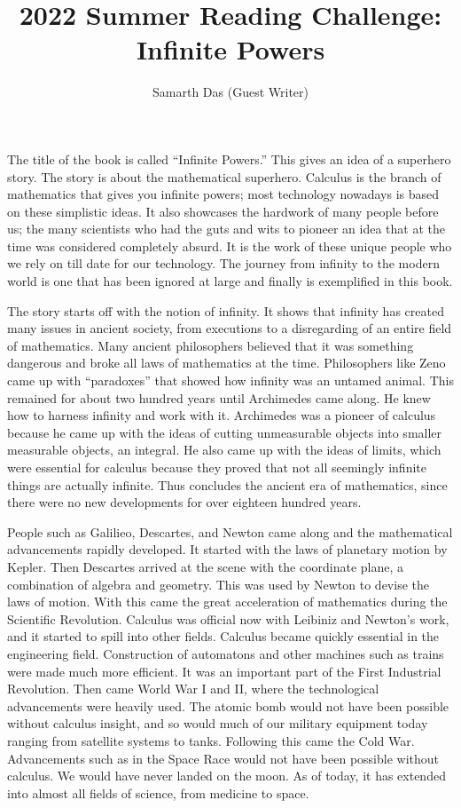 \title{2022 Summer Reading Challenge: Infinite Powers}
\author{Samarth Das (Guest Writer)}


The title of the book is called “Infinite Powers.” This gives an idea of a superhero story. The
story is about the mathematical superhero. Calculus is the branch of mathematics that gives you
infinite powers; most technology nowadays is based on these simplistic ideas. It also showcases
the hardwork of many people before us; the many scientists who had the guts and wits to
pioneer an idea that at the time was considered completely absurd. It is the work of these
unique people who we rely on till date for our technology. The journey from infinity to the modern
world is one that has been ignored at large and finally is exemplified in this book.

\begin{center}
\end{center}

The story starts off with the notion of infinity. It shows that infinity has created many issues in
ancient society, from executions to a disregarding of an entire field of mathematics. Many
ancient philosophers believed that it was something dangerous and broke all laws of
mathematics at the time. Philosophers like Zeno came up with “paradoxes” that showed how
infinity was an untamed animal. This remained for about two hundred years until Archimedes
came along. He knew how to harness infinity and work with it.
Archimedes was a pioneer of calculus because he came up with the ideas of cutting
unmeasurable objects into smaller measurable objects, an integral. He also came up with the
ideas of limits, which were essential for calculus because they proved that not all seemingly
infinite things are actually infinite. Thus concludes the ancient era of mathematics, since there
were no new developments for over eighteen hundred years.

People such as Galilieo, Descartes, and Newton came along and the mathematical
advancements rapidly developed. It started with the laws of planetary motion by Kepler. Then
Descartes arrived at the scene with the coordinate plane, a combination of algebra and
geometry. This was used by Newton to devise the laws of motion. With this came the great
acceleration of mathematics during the Scientific Revolution. Calculus was official now with
Leibiniz and Newton’s work, and it started to spill into other fields.
Calculus became quickly essential in the engineering field. Construction of automatons and
other machines such as trains were made much more efficient. It was an important part of the
First Industrial Revolution. Then came World War I and II, where the technological
advancements were heavily used. The atomic bomb would not have been possible without
calculus insight, and so would much of our military equipment today ranging from satellite
systems to tanks. Following this came the Cold War. Advancements such as in the Space Race
would not have been possible without calculus. We would have never landed on the moon. As
of today, it has extended into almost all fields of science, from medicine to space.

